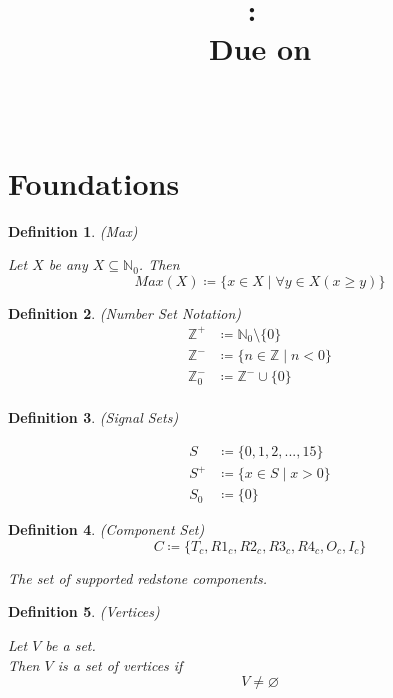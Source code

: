 \documentclass{article}
\title{
    \vspace{2in}
    \textmd{\textbf{\hmwkClass:\ \hmwkTitle}}\\
    \normalsize\vspace{0.1in}\small{Due on \hmwkDueDate}\\
    \vspace{0.1in}\large{\textit{\hmwkClassInstructor\ }}
    \vspace{3in}
}
\author{\hmwkAuthorName}
\date{}
\newtheorem{defn}{Definition}[section]
\begin{document}
\maketitle

\pagebreak

\section{Foundations}

\begin{defn} (Max)
	
	Let \(X\) be any \(X \subseteq \mathbb{N}_{0}\). Then
	\begin{equation}
		Max(X) \coloneq \{x \in X \mid \forall y \in X(x \geq y)\}
	\end{equation}
\end{defn}

\begin{defn} (Number Set Notation)
	\begin{align}
		\mathbb{Z}^+ &\coloneq \mathbb{N}_{0} \setminus \{0\} \\
		\mathbb{Z}^- &\coloneq \{n \in \mathbb{Z}\mid n < 0\} \\
		\mathbb{Z}_{0}^- &\coloneq \mathbb{Z}^- \cup \{0\} \\
	\end{align}
\end{defn}

\medskip

\begin{defn} (Signal Sets)
	
	\begin{align}
		S &\coloneq \{0, 1, 2, ..., 15\} \\
		S^+ &\coloneq \{x \in S \mid x > 0\} \\
		S_{0} &\coloneq \{0\}
	\end{align}
\end{defn}

\medskip

\begin{defn} (Component Set)
	\begin{equation}
		C \coloneq \{T_{c}, R1_{c}, R2_{c}, R3_{c}, R4_{c}, O_{c}, I_{c}\}
	\end{equation}

	The set of supported redstone components. 
\end{defn}

\medskip

\begin{defn} (Vertices)
	
	Let \(V\) be a set. \\
	Then \(V\) is a set of vertices if
	\begin{equation}
		V \neq \varnothing
	\end{equation}
\end{defn}
\end{document}
